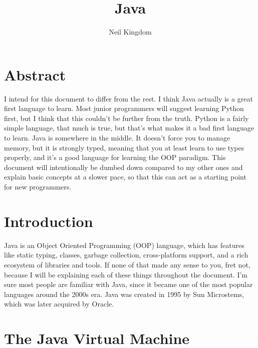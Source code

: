 \documentclass{article}
\title{Java}
\author{Neil Kingdom}
\begin{document}
\begin{titlingpage}

\maketitle

\end{titlingpage}

\newpage

\tableofcontents

\newpage

\section{Abstract}

I intend for this document to differ from the rest. I think Java actually is a great first language to learn.
Most junior programmers will suggest learning Python first, but I think that this couldn’t be further from the
truth. Python is a fairly simple language, that much is true, but that’s what makes it a bad first language to
learn. Java is somewhere in the middle. It doesn’t force you to manage memory, but it is strongly typed,
meaning that you at least learn to use types properly, and it’s a good language for learning the OOP paradigm.
This document will intentionally be dumbed down compared to my other ones and explain basic concepts at a
slower pace, so that this can act as a starting point for new programmers.

\section{Introduction}

Java is an Object Oriented Programming (OOP) language, which has features like static typing, classes, garbage
collection, cross-platform support, and a rich ecosystem of libraries and tools. If none of that made any
sense to you, fret not, because I will be explaining each of these things throughout the document. I’m sure
most people are familiar with Java, since it became one of the most popular languages around the 2000s era.
Java was created in 1995 by Sun Microstems, which was later acquired by Oracle.

\section{The Java Virtual Machine}
\end{document}

